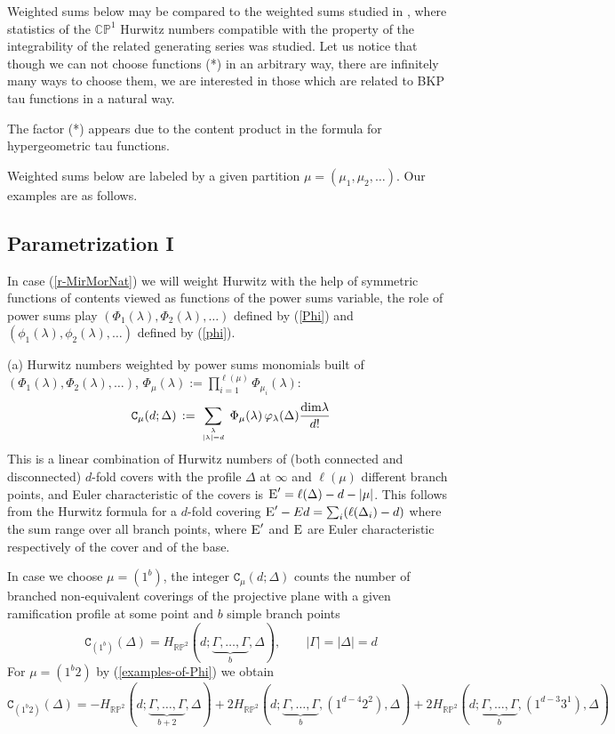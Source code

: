 \documentclass[a4paper,10pt]{article}
\theoremstyle{plain}
\theoremstyle{remark}
\def\be{\begin{equation}}
\def\ee{\end{equation}}
\begin{document}
Weighted sums below may be compared to the weighted sums studied in \cite{HO-2014}, \cite{HarnadMathieu-sept-2014}
where statistics of the $\mathbb{CP}^1$ Hurwitz numbers compatible with the property of the integrability of the related
generating series was studied. Let us notice that
though we can not choose functions (*) in an arbitrary way,
there are infinitely many ways to choose them,
we are interested in those which are related to BKP tau functions in a natural way.

The factor (*) appears due to the content product in the formula for hypergeometric tau functions.

Weighted sums below are labeled by a given partition $\mu=(\mu_1,\mu_2,\dots)$.
Our examples are as follows.


\subsection{Parametrization I}
In case (\ref{r-MirMorNat}) we will weight Hurwitz with the help of symmetric functions of contents
viewed as functions of the power sums variable, the role of power sums play $(\Phi_1(\lambda),\Phi_2(\lambda),\dots)$
defined by (\ref{Phi}) and $(\phi_1(\lambda),\phi_2(\lambda),\dots)$
defined by (\ref{phi}).


(a)  Hurwitz numbers weighted by power sums monomials built of $(\Phi_1(\lambda),\Phi_2(\lambda),\dots)$,
$\Phi_\mu(\lambda):=\prod_{i=1}^{\ell(\mu)} \Phi_{\mu_i}(\lambda)$:
\be\label{texttt-H-mu}
\texttt{C}_{\mu}(d;\Delta)\,:=\,\sum_{\lambda\atop |\lambda|=d}\,
\Phi_\mu(\lambda)\, \varphi_\lambda(\Delta)\frac{{\rm dim}\lambda}{d!}
\ee
This is a linear combination of Hurwitz numbers of (both connected and disconnected) $d$-fold covers with
the profile $\Delta$ at $\infty$ and $\ell(\mu)$ different branch points, and Euler characteristic
of the covers is $\textsc{E}'=\ell(\Delta)-d-|\mu|$. This follows from the Hurwitz formula for a $d$-fold covering
$\textsc{E}'-Ed=\sum_{i}(\ell(\Delta_i)-d)$ where the sum range over all branch points, where $\textsc{E}'$ and
$\textsc{E}$ are Euler characteristic respectively of the cover and of the base.

In case we choose $\mu= (1^b)$, the integer $\texttt{C}_{\mu}(d;\Delta)$ counts the number of branched non-equivalent coverings
of the projective plane with a given ramification profile at some point and $b$ simple branch points
\be\label{BKP-Okounkov-case-Hurwitz}
 \texttt{C}_{(1^b)}(\Delta)= H_{\mathbb{RP}^2}(d;
 \underbrace{\Gamma,\dots,\Gamma }_{b} ,\Delta) ,\qquad |\Gamma|=|\Delta|=d
\ee
For
$\mu=(1^b 2)$ by (\ref{examples-of-Phi}) we obtain
\[
 \texttt{C}_{(1^b2)}(\Delta)=-H_{\mathbb{RP}^2}(d;
 \underbrace{\Gamma,\dots,\Gamma }_{b+2}
 ,\Delta)+2H_{\mathbb{RP}^2}(d;\underbrace{\Gamma,\dots,\Gamma }_{b},(1^{d-4}2^2),\Delta)+
 2H_{\mathbb{RP}^2}(d;\underbrace{\Gamma,\dots,\Gamma }_{b},(1^{d-3}3^1),\Delta)
\]
\end{document}
